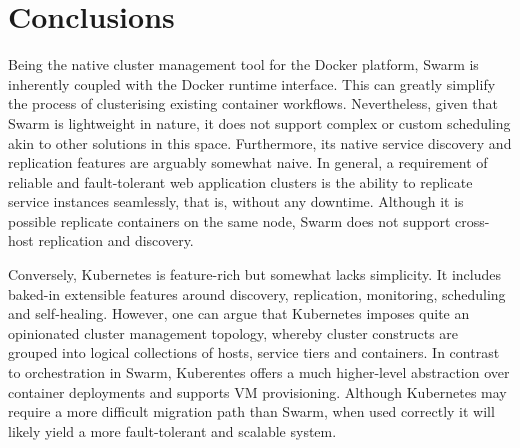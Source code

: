 \documentclass{article}
\begin{document}
\section{Conclusions}
Being the native cluster management tool for the Docker platform, Swarm is inherently coupled with the Docker runtime interface. This can greatly simplify the process of clusterising existing container workflows. Nevertheless, given that Swarm is lightweight in nature, it does not support complex or custom scheduling akin to other solutions in this space. Furthermore, its native service discovery and replication features are arguably somewhat naive. In general, a requirement of reliable and fault-tolerant web application clusters is the ability to replicate service instances seamlessly, that is, without any downtime. Although it is possible replicate containers on the same node, Swarm does not support cross-host replication and discovery. 
\par
Conversely, Kubernetes is feature-rich but somewhat lacks simplicity. It includes baked-in extensible features around discovery, replication, monitoring, scheduling and self-healing. However, one can argue that Kubernetes imposes quite an opinionated cluster management topology, whereby cluster constructs are grouped into logical collections of hosts, service tiers and containers. In contrast to orchestration in Swarm, Kuberentes offers a much higher-level abstraction over container deployments and supports VM provisioning. Although Kubernetes may require a more difficult migration path than Swarm, when used correctly it will likely yield a more fault-tolerant and scalable system.

\vspace{-7.5mm}
\renewcommand{\refname}{\section{References}}

\end{document}

